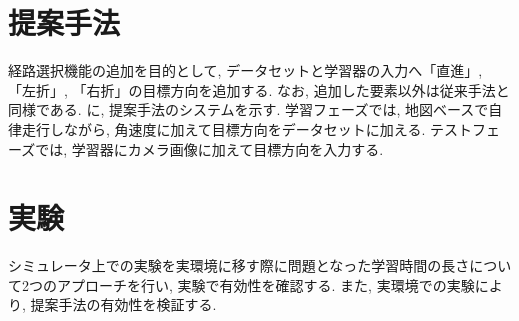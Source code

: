 \documentclass[10pt]{jarticle}
\begin{document}
    \section{提案手法}

    経路選択機能の追加を目的として, データセットと学習器の入力へ「直進」, 「左折」, 「右折」の目標方向を追加する. なお, 追加した要素以外は従来手法と同様である. に, 提案手法のシステムを示す. 
    学習フェーズでは, 地図ベースで自律走行しながら, 角速度に加えて目標方向をデータセットに加える. テストフェーズでは, 学習器にカメラ画像に加えて目標方向を入力する.


    \section{実験}
    シミュレータ上での実験を実環境に移す際に問題となった学習時間の長さについて2つのアプローチを行い, 実験で有効性を確認する. また, 実環境での実験により, 提案手法の有効性を検証する.
\end{document}
